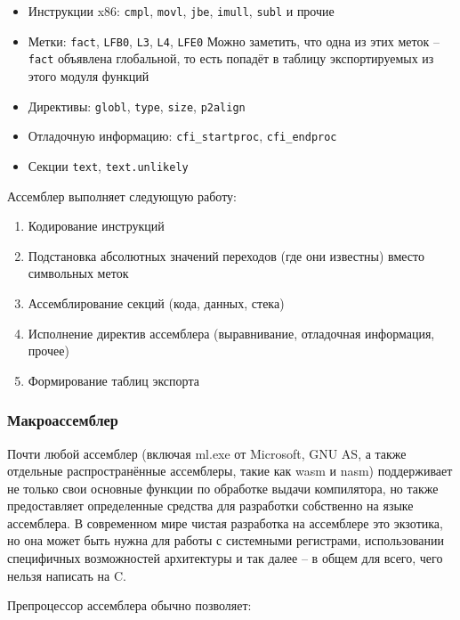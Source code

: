 \documentclass[a4paper,12pt,oneside]{article}
\begin{document}
\begin{itemize}
\item Инструкции x86: \lstinline!cmpl!, \lstinline!movl!, \lstinline!jbe!, \lstinline!imull!, \lstinline!subl! и прочие
\item Метки: \lstinline!fact!, \lstinline!LFB0!, \lstinline!L3!, \lstinline!L4!, \lstinline!LFE0!
Можно заметить, что одна из этих меток -- \lstinline!fact! объявлена глобальной, то есть попадёт в таблицу экспортируемых из этого модуля функций
\item Директивы: \lstinline!globl!, \lstinline!type!, \lstinline!size!, \lstinline!p2align!
\item Отладочную информацию: \lstinline!cfi_startproc!, \lstinline!cfi_endproc!
\item Секции \lstinline!text!, \lstinline!text.unlikely!
\end{itemize}

Ассемблер выполняет следующую работу:

\begin{enumerate}
\item Кодирование инструкций
\item Подстановка абсолютных значений переходов (где они известны) вместо символьных меток
\item Ассемблирование секций (кода, данных, стека)
\item Исполнение директив ассемблера (выравнивание, отладочная информация, прочее)
\item Формирование таблиц экспорта
\end{enumerate}

\subsubsection{Макроассемблер}

Почти любой ассемблер (включая ml.exe от Microsoft, GNU AS, а также отдельные распространённые ассемблеры, такие как wasm и nasm) поддерживает не только свои основные функции по обработке выдачи компилятора, но также предоставляет определенные средства для разработки собственно на языке ассемблера. В современном мире чистая разработка на ассемблере это экзотика, но она может быть нужна для работы с системными регистрами, использовании специфичных возможностей архитектуры и так далее -- в общем для всего, чего нельзя написать на C.

Препроцессор ассемблера обычно позволяет:
\end{document}
